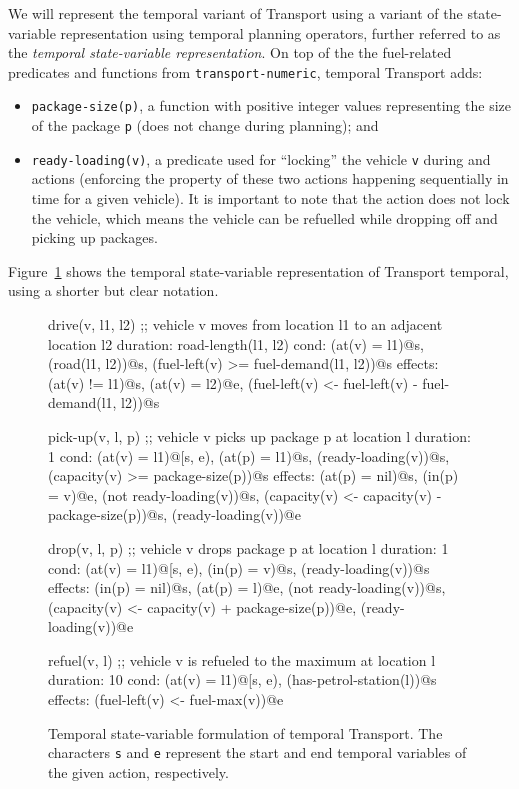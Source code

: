 We will represent the temporal variant of Transport using a variant of the state-variable representation using temporal planning operators, further referred to as the \textit{temporal state-variable representation}.
On top of the the fuel-related predicates and functions from \verb+transport-numeric+, temporal Transport adds:
\begin{itemize}
\item \verb+package-size(p)+, a function with positive integer values representing the size of the package \verb+p+ (does not change during planning); and
\item \verb+ready-loading(v)+, a predicate used for ``locking'' the vehicle \verb+v+ during \pickup{} and \drop{} actions (enforcing the property of these two actions happening sequentially in time for a given vehicle). It is important to note that the  action does not
lock the vehicle, which means the vehicle can be refuelled while dropping off and picking up packages.
\end{itemize}
Figure~\ref{code:statevar-temporal} shows the temporal state-variable representation of Transport temporal, using a shorter but clear notation.

\begin{figure}[tb]
\begin{code}
drive(v, l1, l2)
  ;; vehicle v moves from location l1 to an adjacent location l2
  duration: road-length(l1, l2)
  cond: (at(v) = l1)@s, (road(l1, l2))@s,
        (fuel-left(v) >= fuel-demand(l1, l2))@s
  effects: (at(v) != l1)@s, (at(v) = l2)@e,
           (fuel-left(v) <- fuel-left(v) - fuel-demand(l1, l2))@s

pick-up(v, l, p)
  ;; vehicle v picks up package p at location l
  duration: 1
  cond: (at(v) = l1)@[s, e), (at(p) = l1)@s, (ready-loading(v))@s,
        (capacity(v) >= package-size(p))@s
  effects: (at(p) = nil)@s, (in(p) = v)@e, (not ready-loading(v))@s,
           (capacity(v) <- capacity(v) - package-size(p))@s,
           (ready-loading(v))@e
  
drop(v, l, p)
  ;; vehicle v drops package p at location l
  duration: 1
  cond: (at(v) = l1)@[s, e), (in(p) = v)@s, (ready-loading(v))@s
  effects: (in(p) = nil)@s, (at(p) = l)@e, (not ready-loading(v))@s,
           (capacity(v) <- capacity(v) + package-size(p))@e,
           (ready-loading(v))@e
  
refuel(v, l)
  ;; vehicle v is refueled to the maximum at location l
  duration: 10
  cond: (at(v) = l1)@[s, e), (has-petrol-station(l))@s
  effects: (fuel-left(v) <- fuel-max(v))@e
\end{code}
\caption[State-variable formulation of temporal Transport.]{Temporal state-variable formulation of temporal Transport. The characters \texttt{s} and \texttt{e} represent the start and end temporal variables of the given action, respectively.}
\label{code:statevar-temporal}
\end{figure}

